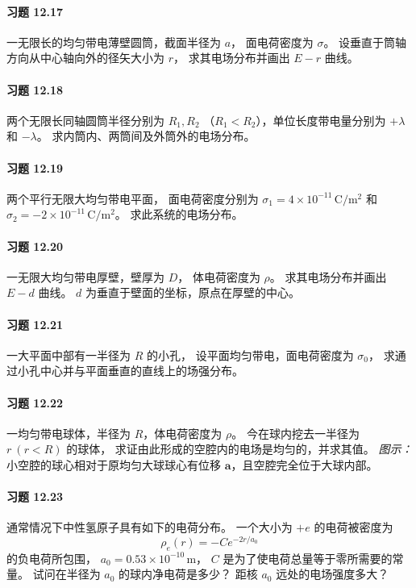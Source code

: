 \paragraph{习题 12.17}
一无限长的均匀带电薄壁圆筒，截面半径为 \(a\)，
面电荷密度为 \(\sigma\)。
设垂直于筒轴方向从中心轴向外的径矢大小为 \(r\)，
求其电场分布并画出 \(E-r\) 曲线。

\paragraph{习题 12.18}
两个无限长同轴圆筒半径分别为 \(R_1,R_2\)
（\(R_1<R_2\)），单位长度带电量分别为
\(+\lambda\) 和 \(-\lambda\)。
求内筒内、两筒间及外筒外的电场分布。

\paragraph{习题 12.19}
两个平行无限大均匀带电平面，
面电荷密度分别为
\(\sigma_1=4\times10^{-11}\,\mathrm{C/m^2}\)
和 \(\sigma_2=-2\times10^{-11}\,\mathrm{C/m^2}\)。
求此系统的电场分布。

\paragraph{习题 12.20}
一无限大均匀带电厚壁，壁厚为 \(D\)，
体电荷密度为 \(\rho\)。
求其电场分布并画出 \(E-d\) 曲线。
\(d\) 为垂直于壁面的坐标，原点在厚壁的中心。

\paragraph{习题 12.21}
一大平面中部有一半径为 \(R\) 的小孔，
设平面均匀带电，面电荷密度为 \(\sigma_0\)，
求通过小孔中心并与平面垂直的直线上的场强分布。

\paragraph{习题 12.22}
一均匀带电球体，半径为 \(R\)，体电荷密度为 \(\rho\)。
今在球内挖去一半径为 \(r\ (r<R)\) 的球体，
求证由此形成的空腔内的电场是均匀的，并求其值。
\textit{图示：}小空腔的球心相对于原均匀大球球心有位移
\(\boldsymbol a\)，且空腔完全位于大球内部。

\paragraph{习题 12.23}
通常情况下中性氢原子具有如下的电荷分布。
一个大小为 \(+e\) 的电荷被密度为
\[
 \rho_e(r)=-C e^{-2r/a_0}
\]
的负电荷所包围，
\(a_0=0.53\times10^{-10}\,\mathrm m\)，
\(C\) 是为了使电荷总量等于零所需要的常量。
试问在半径为 \(a_0\) 的球内净电荷是多少？
距核 \(a_0\) 远处的电场强度多大？


